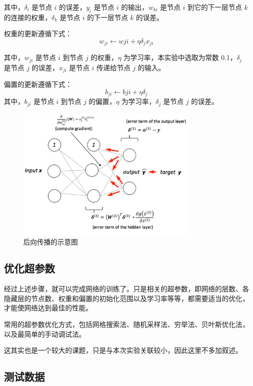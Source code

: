 \documentclass[a4paper, 12pt]{article}
\begin{document}
其中，$\delta_i$ 是节点 $i$ 的误差，$y_i$ 是节点 $i$ 的输出，$w_{ki}$ 是节点 $i$ 到它的下一层节点 $k$ 的连接的权重，$\delta_k$ 是节点 $i$ 的下一层节点 $k$ 的误差。

权重的更新遵循下式：
$$w_{ji} \leftarrow w{ji} + \eta \delta_j x_{ji}$$

其中，$w_{ji}$ 是节点 $i$ 到节点 $j$ 的权重，$\eta$ 为学习率，本实验中选取为常数 0.1，$\delta_j$ 是节点 $j$ 的误差，$x_{ji}$ 是节点 $i$ 传递给节点 $j$ 的输入。

偏置的更新遵循下式：
$$b_{ji} \leftarrow b{ji} + \eta \delta_j$$
其中，$b_{ji}$ 是节点 $i$ 到节点 $j$ 的偏置，$\eta$ 为学习率，$\delta_j$ 是节点 $j$ 的误差。

\begin{figure}[htbp]
\centering
\includegraphics[width=0.8\textwidth]{images/back.png}
\caption{后向传播的示意图}
\label{fig:back}
\end{figure}

\newpage

\subsection{优化超参数}

经过上述步骤，就可以完成网络的训练了。只是相关的超参数，即网络的层数、各隐藏层的节点数、权重和偏置的初始化范围以及学习率等等，都需要适当的优化，才能使网络达到最佳的性能。

常用的超参数优化方式，包括网格搜索法、随机采样法、穷举法、贝叶斯优化法，以及最简单的手动调试法。

这其实也是一个较大的课题，只是与本次实验关联较小，因此这里不多加叙述。

\subsection{测试数据}
\end{document}
